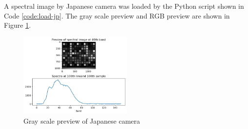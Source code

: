 A spectral image by Japanese camera was loaded by the Python script
shown in Code \ref{code:load-jp}. The gray scale preview and RGB
preview are shown in Figure \ref{fig:japanese-preview}.

\begin{figure}[H]
  \centering
  \caption{Gray scale preview of Japanese camera}
  \label{fig:japanese-preview}
  \includegraphics[width=0.5\textwidth]{./fig-task2/jp.png}
\end{figure}
